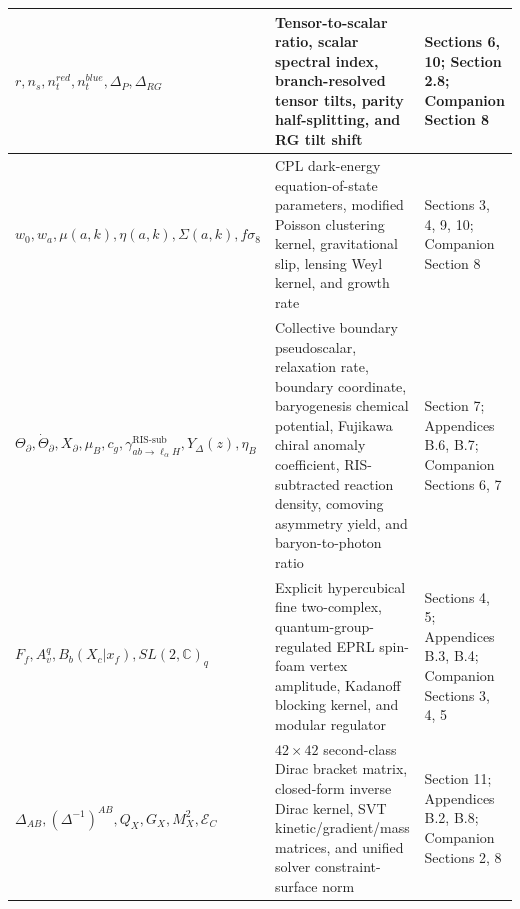\documentclass[aps,prd,onecolumn,superscriptaddress,nofootinbib,longbibliography,10pt]{revtex4-2}
\begin{document}
\begin{center}
\begin{tabular}{|lll|}
      \(r, n_s, n_t^{red}, n_t^{blue}, \Delta_P, \Delta_{RG}\) & Tensor-to-scalar ratio, scalar spectral index, branch-resolved tensor tilts, parity half-splitting, and RG tilt shift & Sections 6, 10; Section 2.8; Companion Section 8 \\ \hline

      \(w_0, w_a, \mu(a,k), \eta(a,k), \Sigma(a,k), f\sigma_8\) & CPL dark-energy equation-of-state parameters, modified Poisson clustering kernel, gravitational slip, lensing Weyl kernel, and growth rate & Sections 3, 4, 9, 10; Companion Section 8 \\ \hline

      \(\Theta_\partial, \dot{\Theta}_\partial, X_\partial, \mu_B, c_g, \gamma_{ab\to\ell_\alpha H}^{\text{RIS-sub}}, Y_\Delta(z), \eta_B\) & Collective boundary pseudoscalar, relaxation rate, boundary coordinate, baryogenesis chemical potential, Fujikawa chiral anomaly coefficient, RIS-subtracted reaction density, comoving asymmetry yield, and baryon-to-photon ratio & Section 7; Appendices B.6, B.7; Companion Sections 6, 7 \\ \hline

      \(F_f, A_v^q, B_b(X_c|x_f), SL(2,\mathbb{C})_q\) & Explicit hypercubical fine two-complex, quantum-group-regulated EPRL spin-foam vertex amplitude, Kadanoff blocking kernel, and modular regulator & Sections 4, 5; Appendices B.3, B.4; Companion Sections 3, 4, 5 \\ \hline

      \(\Delta_{AB}, (\Delta^{-1})^{AB}, Q_X, G_X, M_X^2, \mathcal{E}_C\) & \(42 \times 42\) second-class Dirac bracket matrix, closed-form inverse Dirac kernel, SVT kinetic/gradient/mass matrices, and unified solver constraint-surface norm & Section 11; Appendices B.2, B.8; Companion Sections 2, 8 \\ \hline

    
  \end{tabular}
\end{center}









\end{document}
